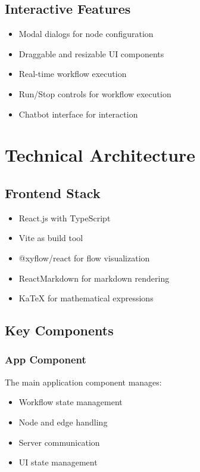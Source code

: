 \documentclass{article}
\begin{document}
\subsection{Interactive Features}
\begin{itemize}
    \item Modal dialogs for node configuration
    \item Draggable and resizable UI components
    \item Real-time workflow execution
    \item Run/Stop controls for workflow execution
    \item Chatbot interface for interaction
\end{itemize}

\section{Technical Architecture}

\subsection{Frontend Stack}
\begin{itemize}
    \item React.js with TypeScript
    \item Vite as build tool
    \item @xyflow/react for flow visualization
    \item ReactMarkdown for markdown rendering
    \item KaTeX for mathematical expressions
\end{itemize}

\subsection{Key Components}

\subsubsection{App Component}
The main application component manages:
\begin{itemize}
    \item Workflow state management
    \item Node and edge handling
    \item Server communication
    \item UI state management
\end{itemize}
\end{document}
